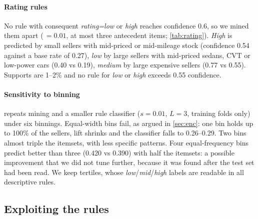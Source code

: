\paragraph{Rating rules} No rule with consequent \emph{rating=low} or \emph{high} reaches confidence 0.6, so we mined them apart ($\,=0.01$, at most three antecedent items; \cref{tab:rating}). \emph{High} is predicted by small sellers with mid-priced or mid-mileage stock (confidence 0.54 against a base rate of 0.27), \emph{low} by large sellers with mid-priced sedans, CVT or low-power cars (0.40 vs 0.19), \emph{medium} by large expensive sellers (0.77 vs 0.55). Supports are 1--2\% and no rule for \emph{low} or \emph{high} exceeds 0.55 confidence.

\begin{table}[t]
\centering
\caption{Top rating rules by lift ($\,=0.01$).}\label{tab:rating}
\end{table}

\paragraph{Sensitivity to binning}  repeats mining and a smaller rule classifier ($s=0.01$, $L=3$, training folds only) under six binnings. Equal-width bins fail, as argued in \cref{sec:enc}: one bin holds up to 100\% of the sellers, lift shrinks and the classifier falls to 0.26--0.29. Two bins almost triple the itemsets, with less specific patterns. Four equal-frequency bins predict better than three (0.420 vs 0.390) with half the itemsets: a possible improvement that we did not tune further, because it was found after the test set had been read. We keep tertiles, whose \emph{low}/\emph{mid}/\emph{high} labels are readable in all descriptive rules.

\begin{table}[t]
\centering
\caption{Binning sensitivity (without rating items): items, itemsets at $\,=0.05$, rules at $\,=0.6$ and their lift, largest support of a numerical bin, and CV macro-F1 of the rule classifier ($s=0.01$, $L=3$).}\label{tab:bin}
\end{table}

\subsection{Exploiting the rules}\label{sec:exploit}
